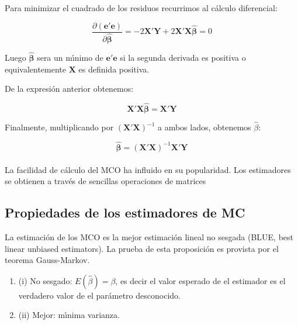 Para minimizar el cuadrado de los residuos recurrimos al c\'alculo diferencial:

\[
\frac{\partial(\mathbf{e'e})}{\partial\mathbf{\hat{\beta}}}=-2\mathbf{X'Y}+2\mathbf{X'X\hat{\beta}}=0
\]

Luego $\mathbf{\hat{\beta}}$ sera un m\'\i{}nimo de \textbf{$\mathbf{e'e}$}
si la segunda derivada es positiva o equivalentemente $\mathbf{X}$
es definida positiva.



De la expresi\'on anterior obtenemos:

\[
\mathbf{X'X\hat{\beta}}=\mathbf{X'Y}
\]

Finalmente, multiplicando por $(\mathbf{X'X})^{-1}$ a ambos lados, obtenemos $\hat\beta$:

\[
\mathbf{\hat\beta}=(\mathbf{X'X})^{-1}\mathbf{X'Y}
\]
\\
La facilidad de c\'alculo del MCO ha influido en su popularidad. Los estimadores se obtienen a trav\'es de sencillas operaciones de matrices 

\subsection{Propiedades de los estimadores de MC}
La estimaci\'on de los MCO es la mejor estimaci\'on lineal no sesgada (BLUE, best linear unbiased estimators). La prueba de esta proposici\'on es provista por el teorema Gauss-Markov.

\begin{enumerate}
	\item (i) No sesgado: $E(\hat{\beta}) = \beta$, es decir el valor esperado de el estimador es el verdadero valor de el par\'ametro desconocido.
	\item (ii) Mejor: m\'\i{}nima varianza.
\end{enumerate}


